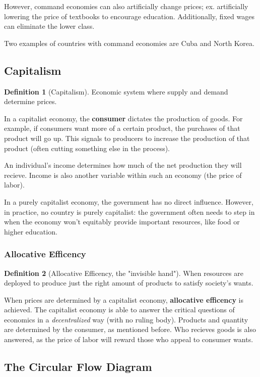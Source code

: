 \documentclass[12pt, a4paper]{article}
\theoremstyle{definition}
\newtheorem{definition}{Definition}
\begin{document}
However, command economies can also artificially change prices; ex. artificially lowering the price of textbooks to encourage education.
Additionally, fixed wages can eliminate the lower class.

Two examples of countries with command economies are Cuba and North Korea.

\subsection{Capitalism}
\begin{definition}[Capitalism]
    Economic system where supply and demand determine prices.
\end{definition}

In a capitalist economy, the \textbf{consumer} dictates the production of goods.
For example, if consumers want more of a certain product, the purchases of that product will go up.
This signals to producers to increase the production of that product (often cutting something else in the process).

An individual's income determines how much of the net production they will recieve.
Income is also another variable within such an economy (the price of labor).

In a purely capitalist economy, the government has no direct influence.
However, in practice, no country is purely capitalist: the government often needs to step in when the economy won't equitably provide important resources, like food or higher education.

\subsubsection{Allocative Efficency}
\begin{definition}[Allocative Efficency, the "invisible hand"]
    When resources are deployed to produce just the right amount of products to satisfy society's wants.
\end{definition}


When prices are determined by a capitalist economy, \textbf{allocative efficency} is achieved.
The capitalist economy is able to answer the critical questions of economics in a \textit{decentralized} way (with no ruling body).
Products and quantity are determined by the consumer, as mentioned before.
Who recieves goods is also answered, as the price of labor will reward those who appeal to consumer wants.

\subsection{The Circular Flow Diagram}
\end{document}
